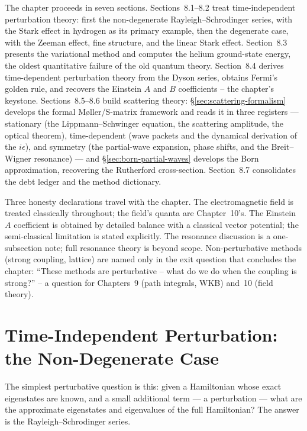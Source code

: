 The chapter proceeds in seven sections. Sections~8.1--8.2 treat time-independent perturbation theory: first the non-degenerate Rayleigh--Schrodinger series, with the Stark effect in hydrogen as its primary example, then the degenerate case, with the Zeeman effect, fine structure, and the linear Stark effect. Section~8.3 presents the variational method and computes the helium ground-state energy, the oldest quantitative failure of the old quantum theory. Section~8.4 derives time-dependent perturbation theory from the Dyson series, obtains Fermi's golden rule, and recovers the Einstein $A$ and $B$ coefficients -- the chapter's keystone. Sections~8.5--8.6 build scattering theory: \S\ref{sec:scattering-formalism} develops the formal M\o{}ller/S-matrix framework and reads it in three registers --- stationary (the Lippmann--Schwinger equation, the scattering amplitude, the optical theorem), time-dependent (wave packets and the dynamical derivation of the $i\epsilon$), and symmetry (the partial-wave expansion, phase shifts, and the Breit--Wigner resonance) --- and \S\ref{sec:born-partial-waves} develops the Born approximation, recovering the Rutherford cross-section. Section~8.7 consolidates the debt ledger and the method dictionary.

Three honesty declarations travel with the chapter. The electromagnetic field is treated classically throughout; the field's quanta are Chapter~10's. The Einstein $A$ coefficient is obtained by detailed balance with a classical vector potential; the semi-classical limitation is stated explicitly. The resonance discussion is a one-subsection note; full resonance theory is beyond scope. Non-perturbative methods (strong coupling, lattice) are named only in the exit question that concludes the chapter: ``These methods are perturbative -- what do we do when the coupling is strong?'' -- a question for Chapters~9 (path integrals, WKB) and~10 (field theory).

\section{Time-Independent Perturbation: the Non-Degenerate Case}
\label{sec:tipt-nondegenerate}

The simplest perturbative question is this: given a Hamiltonian whose exact eigenstates are known, and a small additional term --- a perturbation --- what are the approximate eigenstates and eigenvalues of the full Hamiltonian? The answer is the Rayleigh--Schrodinger series.


